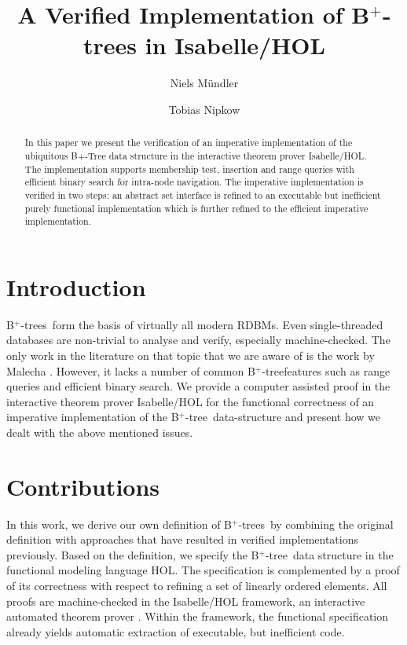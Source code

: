 \documentclass[a4paper,UKenglish,cleveref, autoref, thm-restate]{lipics-v2021}
\title{A Verified Implementation of B$^+$-trees in Isabelle/HOL}
\author{Niels Mündler}{Department of Computer Science, ETH Zurich, Switzerland}{n.muendler@tum.de}{https://orcid.org/0000-0003-3851-2557}{}%
\author{Tobias Nipkow}{Department of Informatics, Technical University of Munich, Germany}{nipkow@in.tum.de}{https://orcid.org/0000-0003-0730-515X}{}
\newcommand{\btree}{B$^+$-tree}
\newcommand{\btrees}{B$^+$-trees}
\begin{document}
\maketitle

\begin{abstract}
    In this paper we present the verification of an imperative
    implementation of the ubiquitous B+-Tree data structure in the
    interactive theorem prover Isabelle/HOL. The implementation supports
    membership test, insertion and range queries with efficient binary
    search for intra-node navigation. The imperative implementation is
    verified in two steps: an abstract set interface is refined to an
    executable but inefficient purely functional implementation which is further
    refined to the efficient imperative implementation.
\end{abstract}

\section{Introduction}
\label{sec:introduction}

\btrees\ form the basis of virtually all modern RDBMs.
Even single-threaded databases are non-trivial to analyse and verify,
especially machine-checked.
The only work in the literature on that topic that we are aware of
is the work by Malecha \cite{DBLP:conf/popl/MalechaMSW10}.
However, it lacks a number of common \btree features such as range
queries and efficient binary search.
We provide a computer assisted proof in the interactive
theorem prover Isabelle/HOL \cite{DBLP:books/sp/NipkowPW02} for the functional
correctness of an imperative implementation of the \btree\ data-structure
and present how we dealt with the above mentioned issues.



\section{Contributions}

In this work, we derive our own definition of \btrees\ 
by combining the original definition
with approaches that have resulted in verified implementations previously.
Based on the definition, we specify the \btree\ data structure in the
functional modeling language HOL.
The specification is complemented by a proof of its correctness
with respect to refining a set of linearly ordered elements.
All proofs are machine-checked in the Isabelle/HOL framework,
an interactive automated theorem prover \cite{DBLP:books/sp/NipkowK14}.
Within the framework,
the functional specification already yields automatic extraction of executable,
but inefficient code.
\end{document}
